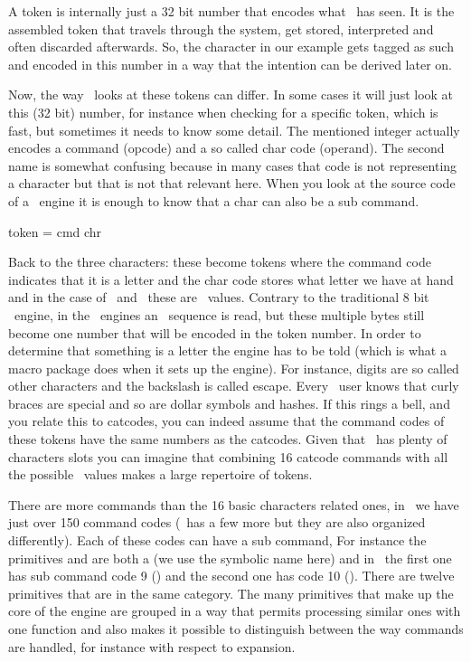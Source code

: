 A token is internally just a 32 bit number that encodes what \TEX\ has seen. It
is the assembled token that travels through the system, get stored, interpreted
and often discarded afterwards. So, the character  in our example gets
tagged as such and encoded in this number in a way that the intention can be
derived later on.

Now, the way \TEX\ looks at these tokens can differ. In some cases it will just
look at this (32 bit) number, for instance when checking for a specific token,
which is fast, but sometimes it needs to know some detail. The mentioned integer
actually encodes a command (opcode) and a so called char code (operand). The
second name is somewhat confusing because in many cases that code is not
representing a character but that is not that relevant here. When you look at the
source code of a \TEX\ engine it is enough to know that a char can also be a sub
command.

\startlinecorrection[blank]
    \setupTABLE[each][align=middle]
    \setupTABLE[c][1][width=44mm]
    \setupTABLE[c][2][width=4em]
    \setupTABLE[c][3][width=11mm]
    \setupTABLE[c][4][width=33mm]
    \bTABLE
        \bTR
            \bTD token \eTD
            \bTD[frame=off] = \eTD
            \bTD cmd   \eTD
            \bTD chr   \eTD
        \eTR
    \eTABLE
\stoplinecorrection

Back to the three characters: these become tokens where the command code
indicates that it is a letter and the char code stores what letter we have at
hand and in the case of \LUATEX\ and \LUAMETATEX\ these are \UNICODE\ values.
Contrary to the traditional 8 bit \TEX\ engine, in the \UNICODE\ engines an \UTF\
sequence is read, but these multiple bytes still become one number that will be
encoded in the token number. In order to determine that something is a letter the
engine has to be told (which is what a macro package does when it sets up the
engine). For instance, digits are so called other characters and the backslash is
called escape. Every \TEX\ user knows that curly braces are special and so are
dollar symbols and hashes. If this rings a bell, and you relate this to catcodes,
you can indeed assume that the command codes of these tokens have the same
numbers as the catcodes. Given that \UNICODE\ has plenty of characters slots you
can imagine that combining 16 catcode commands with all the possible \UNICODE\
values makes a large repertoire of tokens.

There are more commands than the 16 basic characters related ones, in
\LUAMETATEX\ we have just over 150 command codes (\LUATEX\ has a few more but
they are also organized differently). Each of these codes can have a sub
command, For instance the primitives \type {\vbox} and \type {\hbox} are both a
\type {make_box_cmd} (we use the symbolic name here) and in \LUAMETATEX\ the
first one has sub command code 9 (\type {vbox_code}) and the second one has code
10 (\type {hbox_code}). There are twelve primitives that are in the same
category. The many primitives that make up the core of the engine are grouped in
a way that permits processing similar ones with one function and also makes it
possible to distinguish between the way commands are handled, for instance with
respect to expansion.

